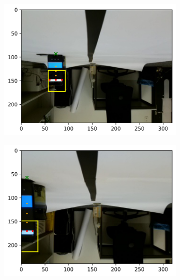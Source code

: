 \documentclass[dvipsnames,svgnames]{beamer}
\begin{document}
\begin{frame}
\begin{figure}[ht]
        \begin{subfigure}[b]{0.4\textwidth}   
            \centering 
            \includegraphics[width=\textwidth]{video/img46.png}
   
            \label{fig:mean and std of net34}
        \end{subfigure}
        \begin{subfigure}[b]{0.4\textwidth}   
            \centering 
            \includegraphics[width=\textwidth]{video/img60.png}
  
            \label{fig:mean and std of net44}
        \end{subfigure}
\end{figure}
\end{frame}
\end{document}
